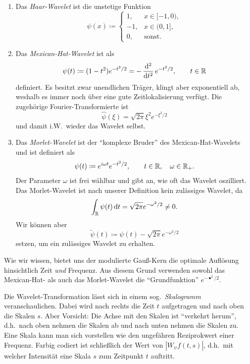 \begin{example}[Wavelets]
\begin{enumerate}
\item Das \emph{Haar-Wavelet} ist die unstetige Funktion
  \[
    \psi(x) \coloneqq \begin{cases}
      1, & x \in [-1,0), \\
      -1, & x \in (0,1], \\
      0, & \text{sonst}.
    \end{cases}
  \]
\item Das \emph{Mexican-Hat-Wavelet} ist als
  \[
    \psi(t) \coloneqq (1 - t^{2}) e^{-t^{2} / 2} = -\dod[2]{}{t} e^{-t^{2} / 2}, \qquad t \in \R
  \]
  definiert. Es besitzt zwar unendlichen Träger, klingt aber exponentiell ab, weshalb es immer noch
  über eine gute Zeitlokalisierung verfügt. Die zugehörige Fourier-Transformierte ist
  \[
    \widehat{\psi}(\xi) = \sqrt{2\pi} \xi^{2} e^{-\xi^{2} / 2}
  \]
  und damit i.W.\ wieder das Wavelet selbst.
\item Das \emph{Morlet-Wavelet} ist der \enquote{komplexe Bruder} des Mexican-Hat-Wavelets und ist
  definiert als
  \[
    \psi(t) \coloneqq e^{i \omega t} e^{-t^{2} / 2}, \qquad t \in \mathbb{R}, \quad \omega \in \mathbb{R}_{+}.
  \]
  Der Parameter $ \omega $ ist frei wählbar und gibt an, wie oft das Wavelet oszilliert.
  Das Morlet-Wavelet ist nach unserer Definition kein zulässiges Wavelet, da
  \[
    \int_{\R} \psi(t) \dif t = \sqrt{2\pi} e^{-\omega^{2} / 2} \neq 0.
  \]
  Wir können aber
  \[
    \widetilde{\psi}(t) \coloneqq \psi(t) - \sqrt{2\pi} e^{-\omega^{2} / 2}
  \]
  setzen, um ein zulässiges Wavelet zu erhalten.
\end{enumerate}
\end{example}

\begin{remark}
Wie wir wissen, bietet uns der modulierte Gauß-Kern die optimale Auflösung hinsichtlich Zeit
\emph{und} Frequenz. Aus diesem Grund verwenden sowohl das Mexican-Hat- als auch das Morlet-Wavelet
die \enquote{Grundfunktion} $ e^{-\bullet^{2} / 2} $.
\end{remark}

\begin{remark}[Skalogramm]
Die Wavelet-Transformation lässt sich in einem sog.\ \emph{Skalogramm} veranschaulichen. Dabei wird
nach rechts die Zeit $ t $ aufgetragen und nach oben die Skalen $ s $. Aber Vorsicht: Die Achse mit
den Skalen ist \enquote{verkehrt herum}, d.h.\ nach oben nehmen die Skalen ab und nach unten nehmen
die Skalen zu. Eine Skala kann man sich vorstellen wie den ungefähren Reziprokwert einer Frequenz.
Farbig codiert ist schließlich der Wert von $ |W_{\psi}f(t,s)| $, d.h.\ mit welcher Intensität eine
Skala $ s $ zum Zeitpunkt $ t $ auftritt.
\end{remark}

